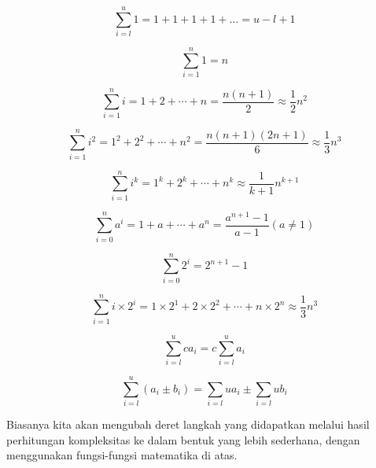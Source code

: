 \begin{equation}\label{eq:common-1}
    \sum\limits_{i=l}^u 1 = 1 + 1 + 1 + 1 + \ldots = u - l + 1
\end{equation}

\begin{equation}\label{eq:common-2}
    \sum\limits_{i=1}^n 1 = n
\end{equation}

\begin{equation}\label{eq:common-3}
    \sum\limits_{i=1}^n i = 1 + 2 + \cdots + n = \frac{n(n + 1)}{2} \approx \frac{1}{2}n^2
\end{equation}

\begin{equation}\label{eq:common-4}
    \sum\limits_{i=1}^n i^2 = 1^2 + 2^2 + \cdots + n^2 = \frac{n(n + 1)(2n + 1)}{6} \approx \frac{1}{3}n^3
\end{equation}

\begin{equation}\label{eq:common-5}
    \sum\limits_{i=1}^n i^k = 1^k + 2^k + \cdots + n^k \approx \frac{1}{k + 1}n^{k+1}
\end{equation}

\begin{equation}\label{eq:common-6}
    \sum\limits_{i=0}^n a^i = 1 + a + \cdots + a^n = \frac{a^{n + 1} - 1}{a - 1}(a \neq 1)
\end{equation}

\begin{equation}\label{eq:common-7}
    \sum\limits_{i=0}^n 2^i = 2^{n + 1} - 1
\end{equation}

\begin{equation}\label{eq:common-8}
    \sum\limits_{i=1}^n i \times 2^i = 1 \times 2^1 + 2 \times 2^2 + \cdots + n \times 2^n \approx \frac{1}{3}n^3
\end{equation}

\begin{equation}\label{eq:common-9}
    \sum\limits_{i=l}^u ca_i = c \sum\limits_{i=l}^u a_i
\end{equation}

\begin{equation}\label{eq:common-10}
    \sum\limits_{i=l}^u (a_i \pm b_i) = \sum\limits_{i=l}{u} a_i \pm \sum\limits_{i=l}{u} b_i
\end{equation}

Biasanya kita akan mengubah deret langkah yang didapatkan melalui hasil perhitungan kompleksitas ke dalam bentuk yang lebih sederhana, dengan menggunakan fungsi-fungsi matematika di atas.

